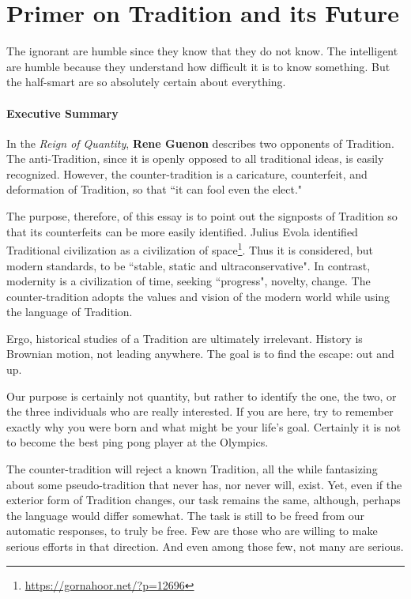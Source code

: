 \section{Primer on Tradition and its Future}

\begin{quotex}
The ignorant are humble since they know that they do not know. The intelligent are humble because they understand how difficult it is to know something. But the half-smart are so absolutely certain about everything. 

\end{quotex}
\paragraph{Executive Summary}
In the \emph{Reign of Quantity}, \textbf{Rene Guenon} describes two opponents of Tradition. The anti-Tradition, since it is openly opposed to all traditional ideas, is easily recognized. However, the counter-tradition is a caricature, counterfeit, and deformation of Tradition, so that ``it can fool even the elect."

The purpose, therefore, of this essay is to point out the signposts of Tradition so that its counterfeits can be more easily identified. Julius Evola identified Traditional civilization as a civilization of space\footnote{\url{https://gornahoor.net/?p=12696}}. Thus it is considered, but modern standards, to be ``stable, static and ultraconservative". In contrast, modernity is a civilization of time, seeking ``progress", novelty, change. The counter-tradition adopts the values and vision of the modern world while using the language of Tradition.

Ergo, historical studies of a Tradition are ultimately irrelevant. History is Brownian motion, not leading anywhere. The goal is to find the escape: out and up.

Our purpose is certainly not quantity, but rather to identify the one, the two, or the three individuals who are really interested. If you are here, try to remember exactly why you were born and what might be your life's goal. Certainly it is not to become the best ping pong player at the Olympics.

The counter-tradition will reject a known Tradition, all the while fantasizing about some pseudo-tradition that never has, nor never will, exist. Yet, even if the exterior form of Tradition changes, our task remains the same, although, perhaps the language would differ somewhat. The task is still to be freed from our automatic responses, to truly be free. Few are those who are willing to make serious efforts in that direction. And even among those few, not many are serious.

